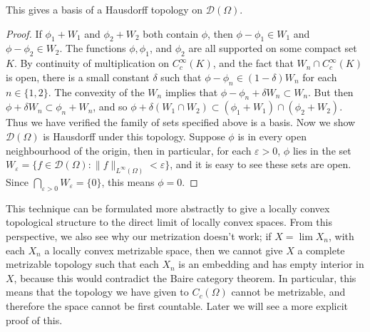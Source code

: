 \begin{theorem}
    This gives a basis of a Hausdorff topology on $\mathcal{D}(\Omega)$.
\end{theorem}
\begin{proof}
    If $\phi_1 + W_1$ and $\phi_2 + W_2$ both contain $\phi$, then $\phi - \phi_1 \in W_1$ and $\phi - \phi_2 \in W_2$. The functions $\phi, \phi_1$, and $\phi_2$ are all supported on some compact set $K$. By continuity of multiplication on $C_c^\infty(K)$, and the fact that $W_n \cap C_c^\infty(K)$ is open, there is a small constant $\delta$ such that $\phi - \phi_n \in (1 - \delta) W_n$ for each $n \in \{ 1, 2 \}$. The convexity of the $W_n$ implies that $\phi - \phi_n + \delta W_n \subset W_n$. But then $\phi + \delta W_n \subset \phi_n + W_n$, and so $\phi + \delta (W_1 \cap W_2) \subset (\phi_1 + W_1) \cap (\phi_2 + W_2)$. Thus we have verified the family of sets specified above is a basis. Now we show $\mathcal{D}(\Omega)$ is Hausdorff under this topology. Suppose $\phi$ is in every open neighbourhood of the origin, then in particular, for each $\varepsilon > 0$, $\phi$ lies in the set $W_\varepsilon = \{ f \in \mathcal{D}(\Omega): \| f \|_{L^\infty(\Omega)} < \varepsilon \}$, and it is easy to see these sets are open. Since $\bigcap_{\varepsilon > 0} W_\varepsilon = \{ 0 \}$, this means $\phi = 0$.
\end{proof}

\begin{remark}
    This technique can be formulated more abstractly to give a locally convex topological structure to the direct limit of locally convex spaces. From this perspective, we also see why our metrization doesn't work; if $X = \lim X_n$, with each $X_n$ a locally convex metrizable space, then we cannot give $X$ a complete metrizable topology such that each $X_n$ is an embedding and has empty interior in $X$, because this would contradict the Baire category theorem. In particular, this means that the topology we have given to $C_c(\Omega)$ cannot be metrizable, and therefore the space cannot be first countable. Later we will see a more explicit proof of this.
\end{remark}

